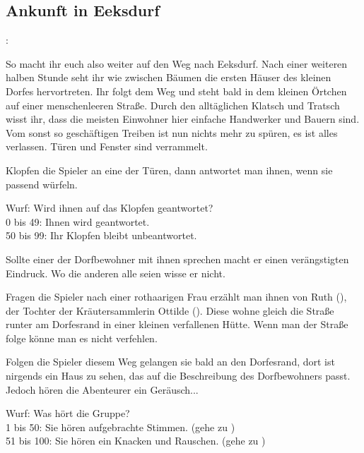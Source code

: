 \subsection{Ankunft in Eeksdurf}
\label{inxd}

:

So macht ihr euch also weiter auf den Weg nach Eeksdurf. Nach einer weiteren halben Stunde seht ihr wie zwischen Bäumen die ersten Häuser des kleinen Dorfes hervortreten. Ihr folgt dem Weg und steht bald in dem kleinen Örtchen auf einer menschenleeren Straße. Durch den alltäglichen Klatsch und Tratsch wisst ihr, dass die meisten Einwohner hier einfache Handwerker und Bauern sind. Vom sonst so geschäftigen Treiben ist nun nichts mehr zu spüren, es ist alles verlassen. Türen und Fenster sind verrammelt.

Klopfen die Spieler an eine der Türen, dann antwortet man ihnen, wenn sie passend würfeln.

\begin{tcolorbox}
  Wurf: Wird ihnen auf das Klopfen geantwortet? \\
  0 bis 49: Ihnen wird geantwortet. \\
  50 bis 99: Ihr Klopfen bleibt unbeantwortet.\\
\end{tcolorbox}

Sollte einer der Dorfbewohner mit ihnen sprechen macht er einen verängstigten Eindruck. Wo die anderen alle seien wisse er nicht.


Fragen die Spieler nach einer rothaarigen Frau erzählt man ihnen von Ruth (\blue{\ref{Ruth}}), der Tochter der Kräutersammlerin Ottilde (\blue{\ref{Ottilde}}). Diese wohne gleich die Straße runter am Dorfesrand in einer kleinen verfallenen Hütte. Wenn man der Straße folge könne man es nicht verfehlen.


Folgen die Spieler diesem Weg gelangen sie bald an den Dorfesrand, dort ist nirgends ein Haus zu sehen, das auf die Beschreibung des Dorfbewohners passt. Jedoch hören die Abenteurer ein Geräusch...

\begin{tcolorbox}
  Wurf: Was hört die Gruppe? \\
  1 bis 50: Sie hören aufgebrachte Stimmen. (gehe zu \blue{\ref{mob}})\\
  51 bis 100: Sie hören ein Knacken und Rauschen. (gehe zu \blue{\ref{feuer}})\\
\end{tcolorbox}

